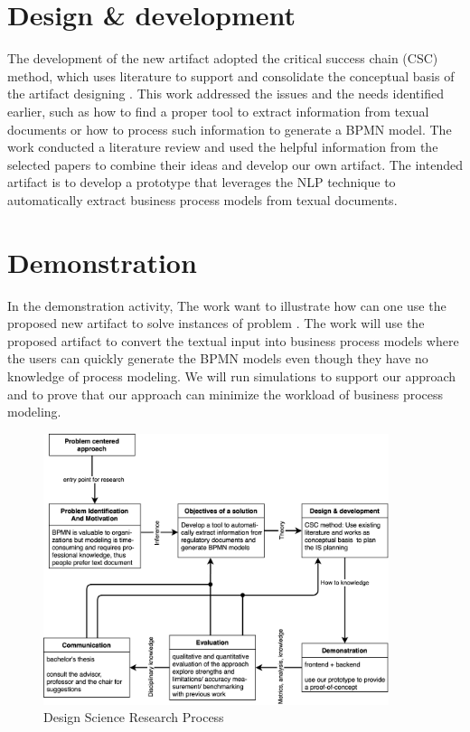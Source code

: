 \section{Design \& development}
The development of the new artifact adopted the critical success chain (CSC) method, which uses literature to support and consolidate the conceptual basis of the artifact designing \cite{DSM_2}. This work addressed the issues and the needs identified earlier, such as how to find a proper tool to extract information from texual documents or how to process such information to generate a BPMN model. The work conducted a literature review and used the helpful information from the selected papers to combine their ideas and develop our own artifact. The intended artifact is to develop a prototype that leverages the NLP technique to automatically extract business process models from texual documents.

\section{Demonstration}
In the demonstration activity, The work want to illustrate how can one use the proposed new artifact to solve instances of problem \cite{DSM_3}. The work will use the proposed artifact to convert the textual input into business process models where the users can quickly generate the BPMN models even though they have no knowledge of process modeling. We will run simulations to support our approach and to prove that our approach can minimize the workload of business process modeling.

\begin{figure}[h]
    \centering
    \caption{Design Science Research Process}
    \includegraphics[width=0.9\textwidth]{tum-resources/images/DSM.png}
\end{figure}

